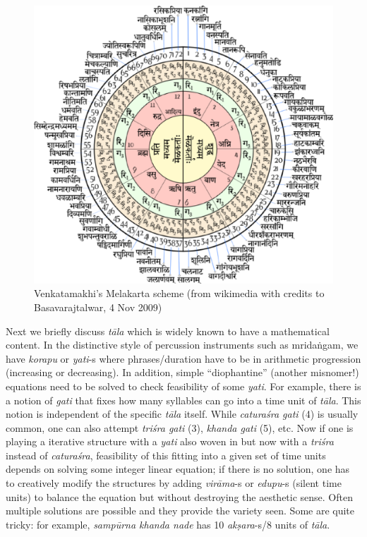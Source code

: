 \begin{figure}[H]
\centering
\includegraphics[scale=.4]{figures/7.eps}
\caption{Venkatamakhi’s Melakarta scheme (from wikimedia with credits to Basavarajtalwar, 4 Nov 2009)}\label{chap7-fig5}
\end{figure}

Next we briefly discuss \textsl{tāla} which is widely known to have a mathematical content. In the distinctive style of percussion instruments such as mridaṅgam, we have \textsl{korapu} or \textsl{yati}-s where phrases/duration have to be in arithmetic progression (increasing or decreasing). In addition, simple “diophantine” (another misnomer!) equations need to be solved to check feasibility of some \textsl{yati}. For example, there is a notion of \textsl{gati} that fixes how many syllables can go into a time unit of \textsl{tāla}. This notion is independent of the specific \textsl{tāla} itself. While \textsl{caturaśra gati} (4) is usually common, one can also attempt \textsl{triśra gati} (3), \textsl{khanda gati} (5), etc. Now if one is playing a iterative structure with a \textsl{yati} also woven in but now with a \textsl{triśra} instead of \textsl{caturaśra}, feasibility of this fitting into a given set of time units depends on solving some integer linear equation; if there is no solution, one has to creatively modify the structures by adding \textsl{virāma}-s or \textsl{edupu}-s (silent time units) to balance the equation but without destroying the aesthetic sense. Often multiple solutions are possible and they provide the variety seen. Some are quite tricky: for example, \textsl{sampūrna khanda nade} has 10 \textsl{akṣara}-s/8 units of \textsl{tāla}.

